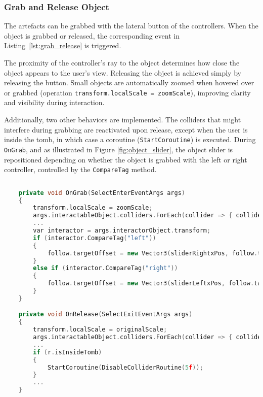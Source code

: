 \subsubsection{Grab and Release Object}
\label{sec:object_interaction}

The artefacts can be grabbed with the lateral button of the controllers.
When the object is grabbed or released, the corresponding event in Listing~\ref{lst:grab_release} is triggered.  

The proximity of the controller's ray to the object determines how close the object appears to the user's view. 
Releasing the object is achieved simply by releasing the button.  
Small objects are automatically zoomed when hovered over or grabbed (operation \texttt{transform.localScale = zoomScale}), improving clarity and visibility during interaction.

Additionally, two other behaviors are implemented. 
The colliders that might interfere during grabbing are reactivated upon release, except when the user is inside the tomb, in which case a coroutine (\texttt{StartCoroutine}) is executed.
During \texttt{OnGrab}, and as illustrated in Figure \ref{fig:object_slider}, the object slider is repositioned depending on whether the object is grabbed with the left or right controller, controlled by the \texttt{CompareTag} method.

\begin{lstlisting}[language=C++, caption={Partial Fragment of objects onGrab and onRelease events.}, label={lst:grab_release}]
     
    private void OnGrab(SelectEnterEventArgs args)
    {
        transform.localScale = zoomScale;
        args.interactableObject.colliders.ForEach(collider => { collider.enabled = false; });
        ...
        var interactor = args.interactorObject.transform;
        if (interactor.CompareTag("left")) 
        {
            follow.targetOffset = new Vector3(sliderRightxPos, follow.targetOffset.y, follow.targetOffset.z);
        }
        else if (interactor.CompareTag("right")) 
        {
            follow.targetOffset = new Vector3(sliderLeftxPos, follow.targetOffset.y, follow.targetOffset.z);
        }
    }

    private void OnRelease(SelectExitEventArgs args)
    {
        transform.localScale = originalScale;
        args.interactableObject.colliders.ForEach(collider => { collider.enabled = true; });
        ...
        if (r.isInsideTomb)
        {
            StartCoroutine(DisableColliderRoutine(5f));
        }
        ...
    }
\end{lstlisting}


